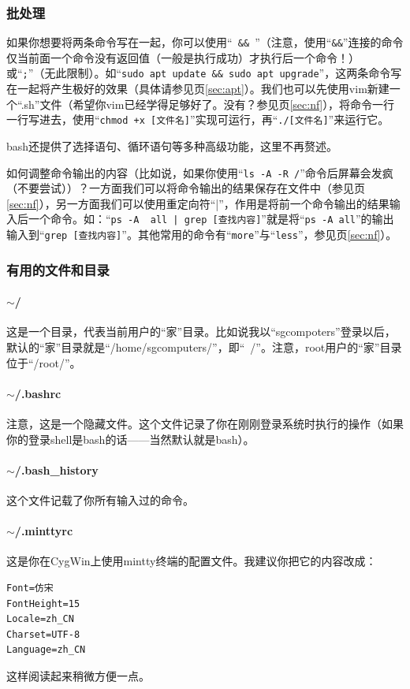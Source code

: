 \subsubsection{批处理}
\label{sec:bat}如果你想要将两条命令写在一起，你可以使用“\verb| && |”（注意，使用“\verb|&&|”连接的命令仅当前面一个命令没有返回值（一般是执行成功）才执行后一个命令！）或“\verb|;|”（无此限制）。如“\verb|sudo apt update && sudo apt upgrade|”，这两条命令写在一起将产生极好的效果（具体请参见\pageref{sec:apt}页\ref{sec:apt}）。我们也可以先使用vim新建一个“.sh”文件（希望你vim已经学得足够好了。没有？参见\pageref{sec:nf}页\ref{sec:nf}），将命令一行一行写进去，使用“\verb|chmod +x [文件名]|”实现可运行，再“\verb|./[文件名]|”来运行它。\par
bash还提供了选择语句、循环语句等多种高级功能，这里不再赘述。\par
如何调整命令输出的内容（比如说，如果你使用“\verb|ls -A -R /|”命令后屏幕会发疯（不要尝试））？一方面我们可以将命令输出的结果保存在文件中（参见\pageref{sec:nf}页\ref{sec:nf}），另一方面我们可以使用重定向符“|”，作用是将前一个命令输出的结果输入后一个命令。如：“\verb/ps -A  all | grep [查找内容]/”就是将“\verb|ps -A all|”的输出输入到“\verb|grep [查找内容]|”。其他常用的命令有“\verb|more|”与“\verb|less|”，参见\pageref{sec:nf}页\ref{sec:nf}）。
\subsubsection{有用的文件和目录}
\paragraph{$\sim$/} 这是一个目录，代表当前用户的“家”目录。比如说我以“sgcompoters”登录以后，默认的“家”目录就是“/home/sgcomputers/”，即“~/”。注意，root用户的“家”目录位于“/root/”。
\paragraph{$\sim$/.bashrc}注意，这是一个隐藏文件。这个文件记录了你在刚刚登录系统时执行的操作（如果你的登录shell是bash的话——当然默认就是bash）。
\paragraph{$\sim$/.bash\_history}这个文件记载了你所有输入过的命令。
\paragraph{$\sim$/.minttyrc}这是你在CygWin上使用mintty终端的配置文件。我建议你把它的内容改成：
\begin{verbatim}
Font=仿宋
FontHeight=15
Locale=zh_CN
Charset=UTF-8
Language=zh_CN
\end{verbatim}\par
这样阅读起来稍微方便一点。
